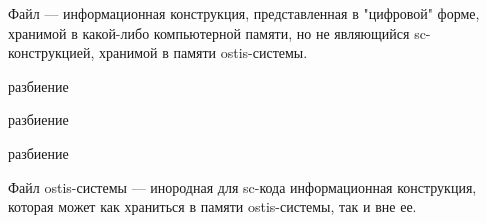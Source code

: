 Файл --- информационная конструкция, представленная в "цифровой" форме, хранимой в какой-либо компьютерной памяти, но не являющийся sc-конструкцией, хранимой в памяти ostis-системы.

\begin{scnrelfromset}{разбиение}
        \begin{scnindent}
            \begin{scnrelfromset}{разбиение}
            \end{scnrelfromset}
        \end{scnindent}
\end{scnrelfromset}

\begin{scnrelfromset}{разбиение}
\end{scnrelfromset}

Файл ostis-системы --- инородная для sc-кода информационная конструкция, которая может как храниться в памяти ostis-системы, так и вне ее.

